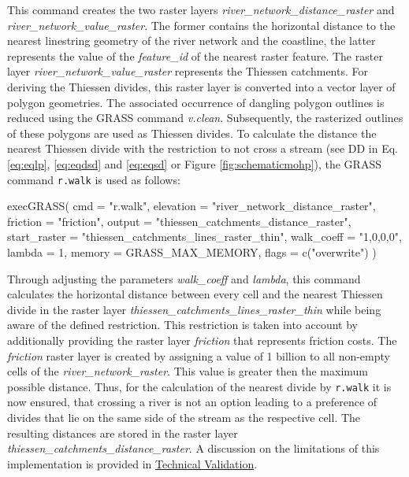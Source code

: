 \documentclass[fleqn,10pt]{wlscirep}
\newenvironment{Shaded}{\begin{snugshade}}{\end{snugshade}}
\newcommand{\AttributeTok}[1]{\textcolor[rgb]{0.77,0.63,0.00}{#1}}
\newcommand{\DecValTok}[1]{\textcolor[rgb]{0.00,0.00,0.81}{#1}}
\newcommand{\FunctionTok}[1]{\textcolor[rgb]{0.00,0.00,0.00}{#1}}
\newcommand{\NormalTok}[1]{#1}
\newcommand{\StringTok}[1]{\textcolor[rgb]{0.31,0.60,0.02}{#1}}
\begin{document}
\normalsize

This command creates the two raster layers \emph{river\_network\_distance\_raster} and \emph{river\_network\_value\_raster}. The former contains the horizontal distance to the nearest linestring geometry of the river network and the coastline, the latter represents the value of the \emph{feature\_id} of the nearest raster feature. The raster layer \emph{river\_network\_value\_raster} represents the Thiessen catchments. For deriving the Thiessen divides, this raster layer is converted into a vector layer of polygon geometries. The associated occurrence of dangling polygon outlines is reduced using the GRASS command \emph{v.clean}. Subsequently, the rasterized outlines of these polygons are used as Thiessen divides. To calculate the distance the nearest Thiessen divide with the restriction to not cross a stream (see DD in Eq. \eqref{eq:eqlp}, \eqref{eq:eqdsd} and \eqref{eq:eqsd} or Figure \ref{fig:schematicmohp}), the GRASS command \texttt{r.walk} is used as follows:

\small

\begin{Shaded}
\begin{Highlighting}[]
\FunctionTok{execGRASS}\NormalTok{(}
  \AttributeTok{cmd =} \StringTok{"r.walk"}\NormalTok{,}
  \AttributeTok{elevation =} \StringTok{"river\_network\_distance\_raster"}\NormalTok{,}
  \AttributeTok{friction =} \StringTok{"friction"}\NormalTok{,}
  \AttributeTok{output =} \StringTok{"thiessen\_catchments\_distance\_raster"}\NormalTok{,}
  \AttributeTok{start\_raster =} \StringTok{"thiessen\_catchments\_lines\_raster\_thin"}\NormalTok{,}
  \AttributeTok{walk\_coeff =} \StringTok{"1,0,0,0"}\NormalTok{,}
  \AttributeTok{lambda =} \DecValTok{1}\NormalTok{,}
  \AttributeTok{memory =}\NormalTok{ GRASS\_MAX\_MEMORY,}
  \AttributeTok{flags =} \FunctionTok{c}\NormalTok{(}\StringTok{"overwrite"}\NormalTok{)}
\NormalTok{)}
\end{Highlighting}
\end{Shaded}

\normalsize

Through adjusting the parameters \emph{walk\_coeff} and \emph{lambda}, this command calculates the horizontal distance between every cell and the nearest Thiessen divide in the raster layer \emph{thiessen\_catchments\_lines\_raster\_thin} while being aware of the defined restriction. This restriction is taken into account by additionally providing the raster layer \emph{friction} that represents friction costs. The \emph{friction} raster layer is created by assigning a value of 1 billion to all non-empty cells of the \emph{river\_network\_raster}. This value is greater then the maximum possible distance. Thus, for the calculation of the nearest divide by \texttt{r.walk} it is now ensured, that crossing a river is not an option leading to a preference of divides that lie on the same side of the stream as the respective cell. The resulting distances are stored in the raster layer \emph{thiessen\_catchments\_distance\_raster}. A discussion on the limitations of this implementation is provided in \protect\hyperlink{technical-validation}{Technical Validation}.
\end{document}
